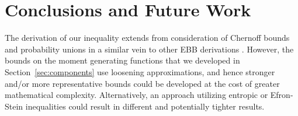 \section{Conclusions and Future Work}\label{sec:future}

The derivation of our inequality extends from consideration of Chernoff bounds and probability unions in a similar vein to other EBB derivations \citep{Maurer50empiricalbernstein,bardenet2015}.
However, the bounds on the moment generating functions that we developed in Section~\ref{sec:components} use loosening approximations, and hence stronger and/or more representative bounds could be developed at the cost of greater mathematical complexity.
Alternatively, an approach utilizing entropic \citep{Boucheron_concentrationinequalities} or Efron-Stein inequalities \citep{efron1981} could result in different and potentially tighter results.



